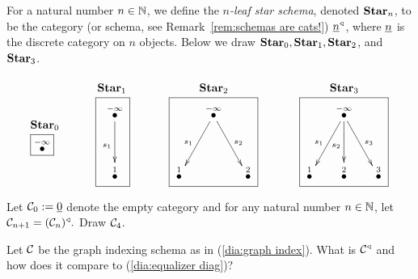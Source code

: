 \documentclass[CT4S-EN-RU]{subfiles}
\begin{document}
\begin{exampleENG}\label{ex:stars}
For a natural number $n\in{\mathbb N}$, we define the {\em $n$-leaf star schema}, denoted ${\mathbf{Star}}_n$, to be the category (or schema, see Remark~\ref{rem:schemas are cats!}) $\underline{n}^\triangleleft$, where $\underline{n}$ is the discrete category on $n$ objects. Below we draw ${\mathbf{Star}}_0, {\mathbf{Star}}_1, {\mathbf{Star}}_2$, and ${\mathbf{Star}}_3$.
$$
\parbox{.3in}{\boxtitle{$\Star_0$}\fbox{$\LMO{-\infty}$}}
\hspace{.5in}
\parbox{.4in}{\boxtitle{$\Star_1$}\fbox{\xymatrix@=15pt{\LMO{-\infty}\ar[dd]_{s_1}\\\\\LMO{1}}}}
\hspace{.5in}
\parbox{1.1in}{\boxtitle{$\Star_2$}\fbox{\xymatrix@=15pt{&\LMO{-\infty}\ar[ddl]_{s_1}\ar[ddr]^{s_2}\\\\\LMO{1}&&\LMO{2}}}}
\hspace{.5in}
\parbox{1.1in}{\boxtitle{$\Star_3$}\fbox{\xymatrix@=15pt{&\LMO{-\infty}\ar[ddl]_{s_1}\ar[dd]_{s_2}\ar[ddr]^{s_3}\\\\\LMO{1}&\LMO{2}&\LMO{3}}}}
$$
\end{exampleENG}

\begin{exampleRUS}\label{ex:stars}
\end{exampleRUS}

\begin{exerciseENG}
Let $\mathcal{C}_0:=\underline{0}$ denote the empty category and for any natural number $n\in{\mathbb N}$, let $\mathcal{C}_{n+1}=(\mathcal{C}_n)^\triangleleft.$ Draw $\mathcal{C}_4$.  
\end{exerciseENG}

\begin{exerciseRUS}
\end{exerciseRUS}

\begin{exerciseENG}
Let $\mathcal{C}$ be the graph indexing schema as in (\ref{dia:graph index}). What is $\mathcal{C}^\triangleleft$ and how does it compare to (\ref{dia:equalizer diag})? 
\end{exerciseENG}

\begin{exerciseRUS}
\end{exerciseRUS}
\end{document}
